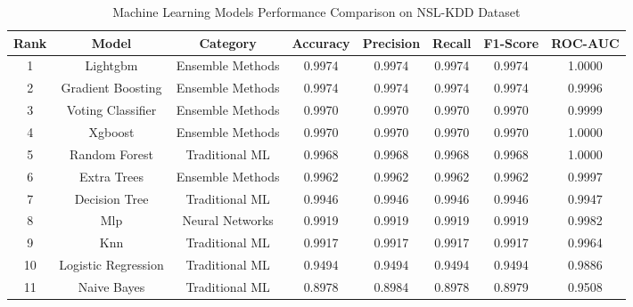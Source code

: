 
\begin{table}[htbp]
\centering
\caption{Machine Learning Models Performance Comparison on NSL-KDD Dataset}
\label{tab:model_performance}
\begin{tabular}{|c|c|c|c|c|c|c|c|}
\hline
\textbf{Rank} & \textbf{Model} & \textbf{Category} & \textbf{Accuracy} & \textbf{Precision} & \textbf{Recall} & \textbf{F1-Score} & \textbf{ROC-AUC} \\
\hline
1 & Lightgbm & Ensemble Methods & 0.9974 & 0.9974 & 0.9974 & 0.9974 & 1.0000 \\
2 & Gradient Boosting & Ensemble Methods & 0.9974 & 0.9974 & 0.9974 & 0.9974 & 0.9996 \\
3 & Voting Classifier & Ensemble Methods & 0.9970 & 0.9970 & 0.9970 & 0.9970 & 0.9999 \\
4 & Xgboost & Ensemble Methods & 0.9970 & 0.9970 & 0.9970 & 0.9970 & 1.0000 \\
5 & Random Forest & Traditional ML & 0.9968 & 0.9968 & 0.9968 & 0.9968 & 1.0000 \\
6 & Extra Trees & Ensemble Methods & 0.9962 & 0.9962 & 0.9962 & 0.9962 & 0.9997 \\
7 & Decision Tree & Traditional ML & 0.9946 & 0.9946 & 0.9946 & 0.9946 & 0.9947 \\
8 & Mlp & Neural Networks & 0.9919 & 0.9919 & 0.9919 & 0.9919 & 0.9982 \\
9 & Knn & Traditional ML & 0.9917 & 0.9917 & 0.9917 & 0.9917 & 0.9964 \\
10 & Logistic Regression & Traditional ML & 0.9494 & 0.9494 & 0.9494 & 0.9494 & 0.9886 \\
11 & Naive Bayes & Traditional ML & 0.8978 & 0.8984 & 0.8978 & 0.8979 & 0.9508 \\
\hline
\end{tabular}
\end{table}

